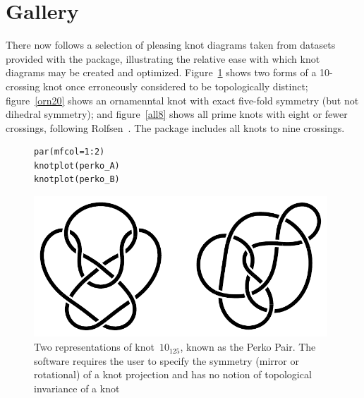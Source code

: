 \documentclass{birkjour}
\theoremstyle{definition}
\theoremstyle{remark}
\numberwithin{equation}{section}
\begin{document}
\clearpage
\section{Gallery}

There now follows a selection of pleasing knot diagrams taken from
datasets provided with the package, illustrating the relative ease
with which knot diagrams may be created and optimized.
Figure~\ref{perko_AB} shows two forms of a 10-crossing knot once
erroneously considered to be topologically distinct;
figure~\ref{orn20} shows an ornamenntal knot with exact five-fold
symmetry (but not dihedral symmetry); and figure~\ref{all8} shows all
prime knots with eight or fewer crossings, following
Rolfsen~\cite{rolfsen1976}.  The package includes all knots to nine
crossings.

\begin{figure}[htbp]
  \begin{center}
\begin{verbatim}
par(mfcol=1:2)
knotplot(perko_A)
knotplot(perko_B)
\end{verbatim}
\includegraphics[width=11cm]{knot-perko_A_and_B}
\caption{Two representations of knot~$10_{125}$, known as the 
  \label{perko_AB}  Perko Pair.  The software requires the user to
  specify the symmetry (mirror or rotational) of a knot projection and
  has no notion of topological invariance of a knot}
  \end{center}
\end{figure}
\end{document}
